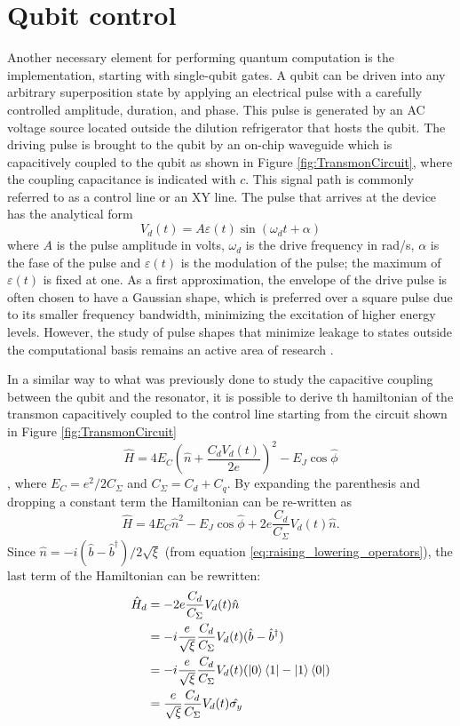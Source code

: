 \section{Qubit control}\label{sec:qubit_control}
Another necessary element for performing quantum computation is the implementation, starting with single-qubit gates. 
A qubit can be driven into any arbitrary superposition state by applying an electrical pulse with a carefully controlled amplitude, duration, and phase.
This pulse is generated by an AC voltage source located outside the dilution refrigerator that hosts the qubit.
The driving pulse is brought to the qubit by an on-chip waveguide which is capacitively coupled to the qubit as shown in Figure \ref{fig:TransmonCircuit}, where the coupling capacitance is indicated with $c$.
This signal path is commonly referred to as a control line or an XY line. The pulse that arrives at the device has the analytical form
\begin{equation}\label{eq:drive_pulse}
    V_d(t) = A\varepsilon(t)\sin{(\omega_d t + \alpha)}
\end{equation}
where $A$ is the pulse amplitude in volts, $\omega_d$ is the drive frequency in rad/s, $\alpha$ is the fase of the pulse and $\varepsilon(t)$ is the modulation of the pulse; the maximum of $\varepsilon(t)$ is fixed at one.
As a first approximation, the envelope of the drive pulse is often chosen to have a Gaussian shape, which is preferred over a square pulse due to its smaller frequency bandwidth, minimizing the excitation of higher energy levels.
However, the study of pulse shapes that minimize leakage to states outside the computational basis remains an active area of research \cite{chiaro2025activeleakagecancellationsingle}.

In a similar way to what was previously done to study the capacitive coupling between the qubit and the resonator, it is possible to derive th hamiltonian of the transmon capacitively coupled to the control line starting from the circuit shown in Figure \ref{fig:TransmonCircuit}
\begin{equation}
    \hat{H} = 4E_C(\hat{n} + \frac{C_d V_d(t)}{2e})^2 - E_J \cos{\hat{\phi}}
\end{equation}, 
where $E_C = e^2/2C_\Sigma$ and $C_\Sigma =  C_d + C_q$. By expanding the parenthesis and dropping a constant term the Hamiltonian can be re-written as
\begin{equation}\label{eq:tmp}
    \hat{H} =  4E_C\hat{n}^2 -E_J\cos{\hat{\phi}} + 2e\frac{C_d}{C_\Sigma}V_d(t)\hat{n}.
\end{equation}
Since $\hat{n} = -i(\hat{b}-\hat{b}^\dagger)/2\sqrt{\xi}$ (from equation \ref{eq:raising_lowering_operators}), the last term of the Hamiltonian can be rewritten:
\begin{align}\label{eq:misto}
    \hat{H}_d &= -2e\frac{C_d}{C_\Sigma}V_d(t)\hat{n}\\
    &=-i\frac{e}{\sqrt{\xi}}\frac{C_d}{C_{\Sigma}}V_d(t)(\hat{b}-\hat{b}^\dagger)\\
    &=-i\frac{e}{\sqrt{\xi}}\frac{C_d}{C_{\Sigma}}V_d(t)(\ket{0}\bra{1}-\ket{1}\bra{0})\\
    &=\frac{e}{\sqrt{\xi}}\frac{C_d}{C_{\Sigma}}V_d(t)\hat{\sigma_y}
\end{align}

